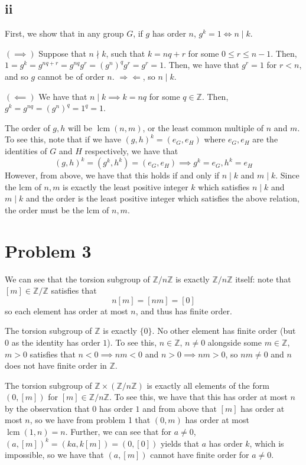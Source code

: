 \documentclass[12pt,letterpaper]{article}
\theoremstyle{definition}
\newcommand{\contra}{\Rightarrow\!\Leftarrow}
\newcommand{\Z}{\mathbb{Z}}
\DeclareMathOperator{\lcm}{lcm}
\begin{document}
\subsection*{ii}

First, we show that in any group \(G\), if \(g\) has order \(n\), \(g^{k} = 1 \iff n \mid k\).

\((\implies)\) Suppose that $n \nmid k$, such that $k = nq + r$ for some $0 \leq r \leq n - 1$. Then, $1 = g^{k} = g^{nq + r} = g^{nq}g^{r} = (g^{n})^{q}g^{r} = g^{r} = 1$. Then, we have that $g^{r} = 1$ for $r < n$, and so $g$ cannot be of order $n$. $\contra$, so $n \mid k$.

\((\impliedby)\) We have that $n \mid k \implies k = nq$ for some $q \in \Z$. Then, $g^{k} = g^{nq} = (g^{n})^{q} = 1^{q} = 1$.

The order of \(g,h\) will be \(\lcm(n,m)\), or the least common multiple of \(n\) and \(m\). To see this, note that if we have \((g,h)^{k} = (e_{G}, e_{H})\) where \(e_{G}, e_{H}\) are the identities of \(G\) and \(H\) respectively, we have that
\[
  (g,h)^{k} = (g^{k},h^{k}) = (e_{G}, e_{H}) \implies g^{k} = e_{G}, h^{k} = e_{H}
\]
However, from above, we have that this holds if and only if $n \mid k$ and $m \mid k$. Since the lcm of $n, m$ is exactly the least positive integer $k$ which satisfies $n \mid k$ and $m \mid k$ and the order is the least positive integer which satisfies the above relation, the order must be the lcm of $n, m$.

\section*{Problem 3}

We can see that the torsion subgroup of $\Z/n\Z$ is exactly $\Z/n\Z$ itself: note that $[m] \in \Z/\Z$ satisfies that
\[
  n[m] = \left[nm\right] = [0]
\]
so each element has order at most $n$, and thus has finite order.

The torsion subgroup of $\Z$ is exactly $\{0\}$. No other element has finite order (but $0$ as the identity has order $1$). To see this, $n \in \Z$, $n \neq 0$ alongside some $m \in \Z$, $m > 0$ satisfies that $n < 0 \implies nm < 0$ and $n > 0 \implies nm > 0$, so $nm \neq 0$ and $n$ does not have finite order in $\Z$.

The torsion subgroup of $\Z \times (\Z/n\Z)$ is exactly all elements of the form $(0,[m])$ for $[m] \in \Z/n\Z$. To see this, we have that this has order at most $n$ by the observation that $0$ has order $1$ and from above that $[m]$ has order at most $n$, so we have from problem 1 that $(0,m)$ has order at most $\lcm(1,n) = n$. Further, we can see that for $a \neq 0$, $(a,[m])^{k} = (ka, k[m]) = (0, [0])$ yields that $a$ has order $k$, which is impossible, so we have that $(a,[m])$ cannot have finite order for $a \neq 0$.
\end{document}
